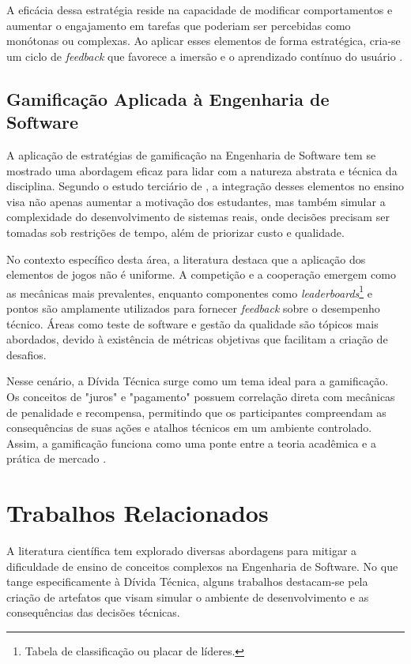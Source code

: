 \documentclass[12pt,openright,oneside,a4paper,brazil]{abntex2}
\begin{document}
A eficácia dessa estratégia reside na capacidade de modificar comportamentos e aumentar o engajamento em tarefas que poderiam ser percebidas como monótonas ou complexas. Ao aplicar esses elementos de forma estratégica, cria-se um ciclo de \textit{feedback} que favorece a imersão e o aprendizado contínuo do usuário \cite{TONHAO2023}.

\subsection{Gamificação Aplicada à Engenharia de Software}

A aplicação de estratégias de gamificação na Engenharia de Software tem se mostrado uma abordagem eficaz para lidar com a natureza abstrata e técnica da disciplina. Segundo o estudo terciário de \cite{TONHAO2023}, a integração desses elementos no ensino visa não apenas aumentar a motivação dos estudantes, mas também simular a complexidade do desenvolvimento de sistemas reais, onde decisões precisam ser tomadas sob restrições de tempo, além de priorizar custo e qualidade.

No contexto específico desta área, a literatura destaca que a aplicação dos elementos de jogos não é uniforme. A competição e a cooperação emergem como as mecânicas mais prevalentes, enquanto componentes como \textit{leaderboards}\footnote{Tabela de classificação ou placar de líderes.} e pontos são amplamente utilizados para fornecer \textit{feedback} sobre o desempenho técnico. Áreas como teste de software e gestão da qualidade são tópicos mais abordados, devido à existência de métricas objetivas que facilitam a criação de desafios.

Nesse cenário, a Dívida Técnica surge como um tema ideal para a gamificação. Os conceitos de "juros" e "pagamento" possuem correlação direta com mecânicas de penalidade e recompensa, permitindo que os participantes compreendam as consequências de suas ações e atalhos técnicos em um ambiente controlado. Assim, a gamificação funciona como uma ponte entre a teoria acadêmica e a prática de mercado \cite{TONHAO2023,Khaldi2023,Ruiz2024}.

\section{Trabalhos Relacionados}

A literatura científica tem explorado diversas abordagens para mitigar a dificuldade de ensino de conceitos complexos na Engenharia de Software. No que tange especificamente à Dívida Técnica, alguns trabalhos destacam-se pela criação de artefatos que visam simular o ambiente de desenvolvimento e as consequências das decisões técnicas.
\end{document}
